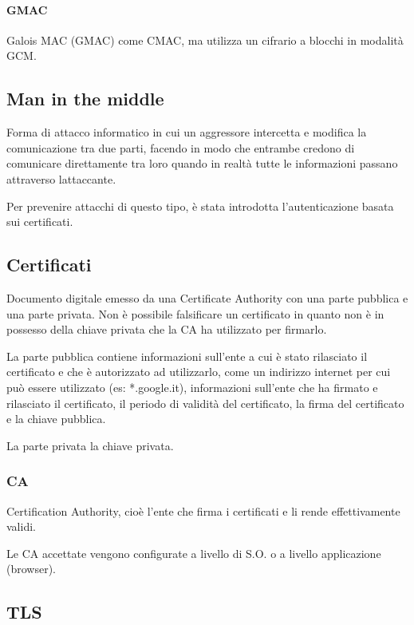 \paragraph{GMAC}\label{gmac}

Galois MAC (GMAC) come CMAC, ma utilizza un cifrario a blocchi in
modalità GCM.

\subsection{Man in the middle}\label{man-in-the-middle}

Forma di attacco informatico in cui un aggressore intercetta e modifica
la comunicazione tra due parti, facendo in modo che entrambe credono di
comunicare direttamente tra loro quando in realtà tutte le informazioni
passano attraverso l\textquotesingle attaccante.

Per prevenire attacchi di questo tipo, è stata introdotta
l'autenticazione basata sui certificati.

\subsection{Certificati}\label{certificati}

Documento digitale emesso da una Certificate Authority con una parte
pubblica e una parte privata. Non è possibile falsificare un certificato
in quanto non è in possesso della chiave privata che la CA ha utilizzato
per firmarlo.

La parte pubblica contiene informazioni sull'ente a cui è stato
rilasciato il certificato e che è autorizzato ad utilizzarlo, come un
indirizzo internet per cui può essere utilizzato (es: *.google.it),
informazioni sull'ente che ha firmato e rilasciato il certificato, il
periodo di validità del certificato, la firma del certificato e la
chiave pubblica.

La parte privata la chiave privata.

\subsubsection{CA}\label{ca}

Certification Authority, cioè l'ente che firma i certificati e li rende
effettivamente validi.

Le CA accettate vengono configurate a livello di S.O. o a livello
applicazione (browser).

\subsection{TLS}\label{tls}

